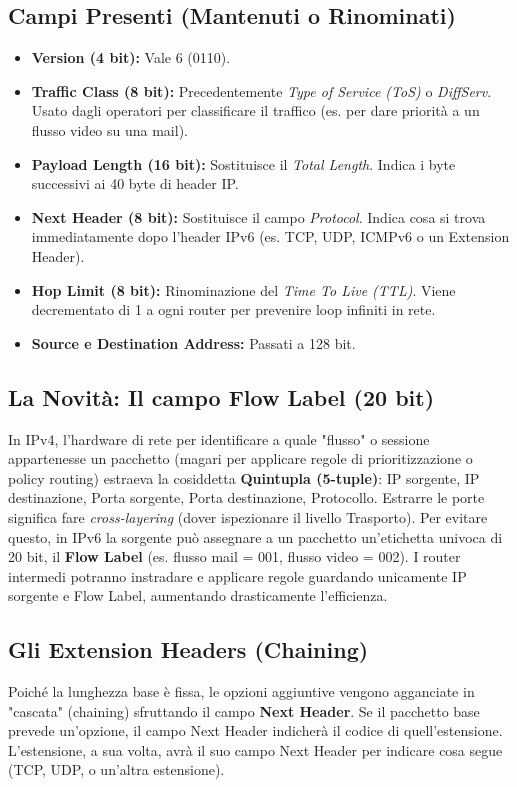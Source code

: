 \subsection{Campi Presenti (Mantenuti o Rinominati)}
\begin{itemize}
    \item \textbf{Version (4 bit):} Vale 6 (0110).
    \item \textbf{Traffic Class (8 bit):} Precedentemente \textit{Type of Service (ToS)} o \textit{DiffServ}. Usato dagli operatori per classificare il traffico (es. per dare priorità a un flusso video su una mail).
    \item \textbf{Payload Length (16 bit):} Sostituisce il \textit{Total Length}. Indica i byte successivi ai 40 byte di header IP.
    \item \textbf{Next Header (8 bit):} Sostituisce il campo \textit{Protocol}. Indica cosa si trova immediatamente dopo l'header IPv6 (es. TCP, UDP, ICMPv6 o un Extension Header).
    \item \textbf{Hop Limit (8 bit):} Rinominazione del \textit{Time To Live (TTL)}. Viene decrementato di 1 a ogni router per prevenire loop infiniti in rete.
    \item \textbf{Source e Destination Address:} Passati a 128 bit.
\end{itemize}

\subsection{La Novità: Il campo Flow Label (20 bit)}
In IPv4, l'hardware di rete per identificare a quale "flusso" o sessione appartenesse un pacchetto (magari per applicare regole di prioritizzazione o policy routing) estraeva la cosiddetta \textbf{Quintupla (5-tuple)}: IP sorgente, IP destinazione, Porta sorgente, Porta destinazione, Protocollo. Estrarre le porte significa fare \textit{cross-layering} (dover ispezionare il livello Trasporto).
Per evitare questo, in IPv6 la sorgente può assegnare a un pacchetto un'etichetta univoca di 20 bit, il \textbf{Flow Label} (es. flusso mail = 001, flusso video = 002). I router intermedi potranno instradare e applicare regole guardando unicamente IP sorgente e Flow Label, aumentando drasticamente l'efficienza.

\subsection{Gli Extension Headers (Chaining)}
Poiché la lunghezza base è fissa, le opzioni aggiuntive vengono agganciate in "cascata" (chaining) sfruttando il campo \textbf{Next Header}.
Se il pacchetto base prevede un'opzione, il campo Next Header indicherà il codice di quell'estensione. L'estensione, a sua volta, avrà il suo campo Next Header per indicare cosa segue (TCP, UDP, o un'altra estensione).


